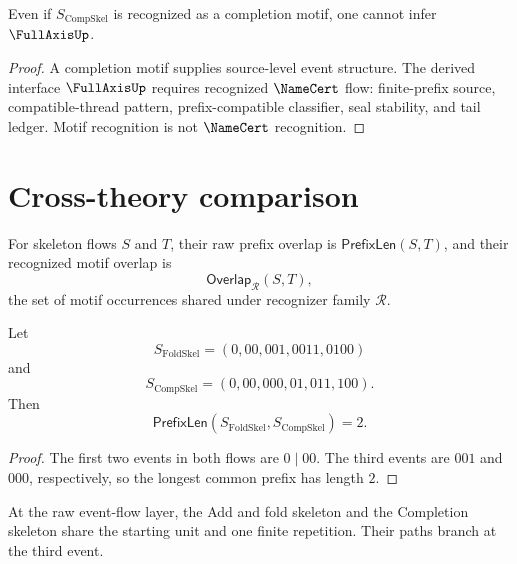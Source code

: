 \begin{theorem}
\label{thm:case-studies-completion-not-fullaxis}
Even if $S_{\mathrm{CompSkel}}$ is recognized as a completion motif, one cannot infer $\FullAxisUp$.
\end{theorem}

\begin{proof}
A completion motif supplies source-level event structure. The derived interface $\FullAxisUp$ requires recognized $\NameCert$ flow: finite-prefix source, compatible-thread pattern, prefix-compatible classifier, seal stability, and tail ledger. Motif recognition is not $\NameCert$ recognition.
\end{proof}

\section{Cross-theory comparison}
\label{sec:case-studies-cross-comparison}

\begin{definition}
\label{def:case-studies-skeleton-overlap}
For skeleton flows $S$ and $T$, their raw prefix overlap is $\mathsf{PrefixLen}(S,T)$, and their recognized motif overlap is
$$
  \mathsf{Overlap}_{\mathcal R}(S,T),
$$
the set of motif occurrences shared under recognizer family $\mathcal R$.
\end{definition}

\begin{proposition}
\label{prop:case-studies-fold-completion-prefix}
Let
$$
  S_{\mathrm{FoldSkel}}=(0,00,001,0011,0100)
$$
and
$$
  S_{\mathrm{CompSkel}}=(0,00,000,01,011,100).
$$
Then
$$
  \mathsf{PrefixLen}(S_{\mathrm{FoldSkel}},S_{\mathrm{CompSkel}})=2.
$$
\end{proposition}

\begin{proof}
The first two events in both flows are $0\mid 00$. The third events are $001$ and $000$, respectively, so the longest common prefix has length $2$.
\end{proof}

\begin{corollary}
\label{cor:case-studies-shared-prefix-source}
At the raw event-flow layer, the Add and fold skeleton and the Completion skeleton share the starting unit and one finite repetition. Their paths branch at the third event.
\end{corollary}

